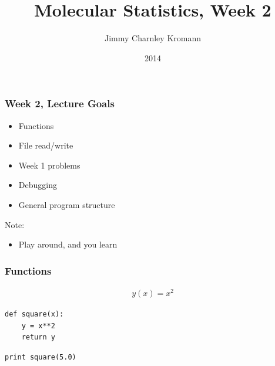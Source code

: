 \documentclass{beamer}
\title[]{Molecular Statistics, Week 2}
\institute[University of Copenhagen]{Department of Chemistry \\ University of Copenhagen}
\author[Jimmy Charnley Kromann]{Jimmy Charnley Kromann}
\date{2014}
\begin{document}
\frame[plain]{\titlepage}


\begin{frame}[fragile]

    \frametitle{Week 2, Lecture Goals}

    \begin{itemize}
        \item Functions
        \item File read/write
        \item Week 1 problems
        \item Debugging
        \item General program structure
    \end{itemize}

    \bigskip

    Note:
    \begin{itemize}

        \item Play around, and you learn

    \end{itemize}

\end{frame}


\begin{frame}[fragile]

    \frametitle{Functions}

    \begin{align*}
        y(x) = x^2
    \end{align*}

    \bigskip
    \bigskip

\begin{lstlisting}
def square(x):
    y = x**2
    return y

\end{lstlisting}

\begin{lstlisting}
print square(5.0)

\end{lstlisting}



\end{frame}
\end{document}
